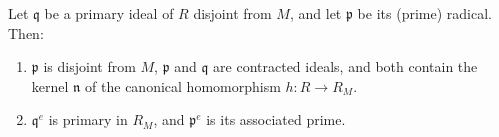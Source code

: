 Let $\mathfrak{q}$ be a primary ideal of $R$ disjoint from $M$, and let $\mathfrak{p}$ be its (prime) radical. Then:

\begin{enumerate}
\item[(a)] $\mathfrak{p}$ is disjoint from $M$, $\mathfrak{p}$ and $\mathfrak{q}$ are contracted ideals, and both contain the kernel $\mathfrak{n}$ of the canonical homomorphism $h: R \to R_M$.
\item[(b)] $\mathfrak{q}^e$ is primary in $R_M$, and $\mathfrak{p}^e$ is its associated prime.
\end{enumerate}
